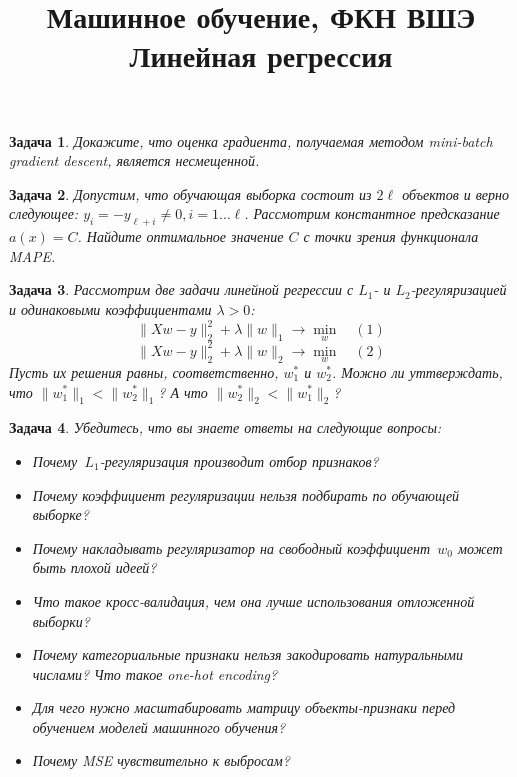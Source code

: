 \documentclass[12pt,fleqn]{article}
\title{Машинное обучение, ФКН ВШЭ\\Линейная регрессия}
\author{}
\date{}
\newtheorem{esProblem}{Задача}
\begin{document}
\maketitle

\begin{esProblem}
    Докажите, что оценка градиента, получаемая методом mini-batch gradient descent, является несмещенной.
\end{esProblem}

\begin{esProblem}
    Допустим, что обучающая выборка состоит из $2\ell$ объектов и верно следующее: $y_i = -y_{\ell + i} \ne 0, i = 1 \dots \ell$. Рассмотрим константное предсказание $a(x) = C$. Найдите оптимальное значение $C$ с точки зрения функционала MAPE.
\end{esProblem}

\begin{esProblem}
    Рассмотрим две задачи линейной регрессии с $L_1$- и $L_2$-регуляризацией и одинаковыми коэффициентами $\lambda > 0$:
    \[
        \|Xw - y\|^2_2 + \lambda \|w\|_1 \rightarrow \displaystyle\min_{w} \quad (1)
    \]
    \[
        \|Xw - y\|^2_2 + \lambda \|w\|_2 \rightarrow \displaystyle\min_{w} \quad (2)
    \]
    Пусть их решения равны, соответственно, $w_1^*$ и $w_2^*$. Можно ли уттверждать, что $\|w_1^*\|_1 < \|w_2^*\|_1$? А что $\|w_2^*\|_2 < \|w_1^*\|_2$?
\end{esProblem}

\begin{esProblem}
    Убедитесь, что вы знаете ответы на следующие вопросы:
    \begin{itemize}
        \item Почему~$L_1$-регуляризация производит отбор признаков?
        \item Почему коэффициент регуляризации нельзя подбирать по обучающей выборке?
        \item Почему накладывать регуляризатор на свободный коэффициент~$w_0$ может быть плохой идеей?
        \item Что такое кросс-валидация, чем она лучше использования отложенной выборки?
        \item Почему категориальные признаки нельзя закодировать натуральными числами? Что такое one-hot encoding?
        \item Для чего нужно масштабировать матрицу объекты-признаки перед обучением моделей машинного обучения?
        \item Почему MSE чувствительно к выбросам?
    \end{itemize}
\end{esProblem}
\end{document}
